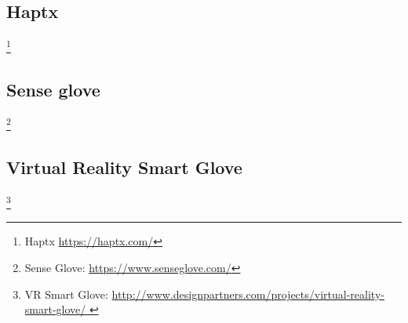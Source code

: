 \subsection{Haptx}
\footnote{ Haptx \url{https://haptx.com/}}

\subsection{Sense glove}
\footnote{Sense Glove: \url{https://www.senseglove.com/}}

\subsection{Virtual Reality Smart Glove}
\footnote{VR Smart Glove: \url{http://www.designpartners.com/projects/virtual-reality-smart-glove/
}}

